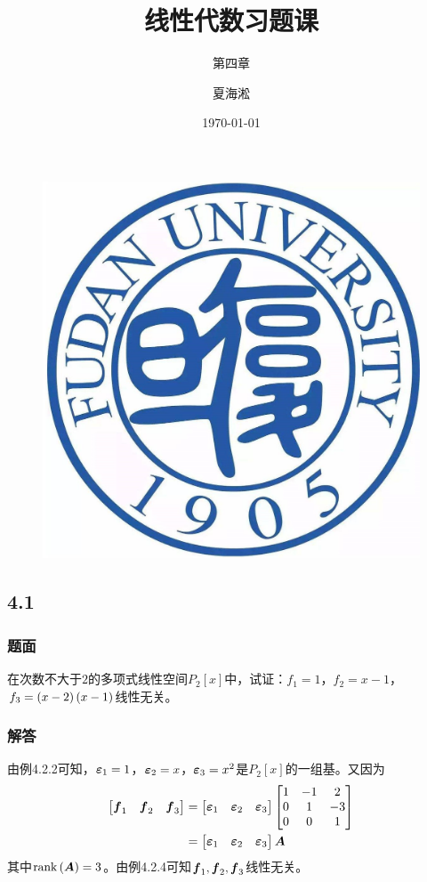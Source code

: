 \documentclass{beamer}
\author{夏海淞}
\title{线性代数习题课}
\subtitle{第四章}
\date{\today}
\begin{document}
\setlength{\parskip}{0.45\baselineskip}

\begin{frame}
    \titlepage
    \begin{figure}[htpb]
        \begin{center}
            \vspace*{-0.5cm}
            \includegraphics[width=0.1\linewidth]{../../pic/FDU.jpeg}
        \end{center}
    \end{figure}
\end{frame}

\subsection*{4.1}
\begin{frame}
    \frametitle{题面}
    在次数不大于\(2\)的多项式线性空间\(P_2[x]\)中，试证：\(f_1=1\)，\(f_2=x-1\)，\(f_3=\left( x-2 \right)\left( x-1 \right)\)线性无关。
\end{frame}

\begin{frame}
    \frametitle{解答}
    由例4.2.2可知，\(\boldsymbol{\varepsilon}_1=1\)，\(\boldsymbol{\varepsilon}_2=x\)，\(\boldsymbol{\varepsilon}_3=x^2\)是\(P_2[x]\)的一组基。又因为
    \begin{align*}
        \begin{bmatrix}
            \boldsymbol{f}_1 & \boldsymbol{f}_2 & \boldsymbol{f}_3
        \end{bmatrix}
         & =
        \begin{bmatrix}
            \boldsymbol{\varepsilon}_1 & \boldsymbol{\varepsilon}_2 & \boldsymbol{\varepsilon}_3
        \end{bmatrix}
        \begin{bmatrix}
            1 & -1 & 2  \\
            0 & 1  & -3 \\
            0 & 0  & 1
        \end{bmatrix} \\
         & =
        \begin{bmatrix}
            \boldsymbol{\varepsilon}_1 & \boldsymbol{\varepsilon}_2 & \boldsymbol{\varepsilon}_3
        \end{bmatrix}\boldsymbol{A}
    \end{align*}
    其中\(\mathrm{rank}\left( \boldsymbol{A} \right)=3\)。由例4.2.4可知\(\boldsymbol{f}_1,\boldsymbol{f}_2,\boldsymbol{f}_3\)线性无关。
\end{frame}
\end{document}
